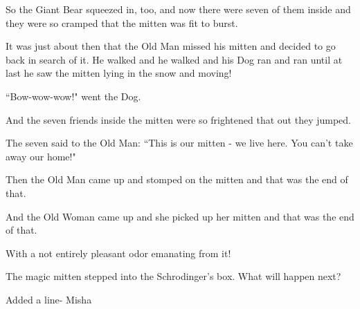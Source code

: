 \documentclass{article}
\begin{document}
So the Giant Bear squeezed in, too, and now there were seven of them inside and they were so cramped that the mitten was fit to burst.



It was just about then that the Old Man missed his mitten and decided to go back in search of it. He walked and he walked and his Dog ran and ran until at last he saw the mitten lying in the snow and moving!

``Bow-wow-wow!" went the Dog.

And the seven friends inside the mitten were so frightened that out they jumped.

The seven said to the Old Man: ``This is our mitten - we live here. You can't take away our home!"

Then the Old Man came up and stomped on the mitten and that was the end of that.

And the Old Woman came up and she picked up her mitten and that was the end of that.

With a not entirely pleasant odor emanating from it!

The magic mitten stepped into the Schrodinger's box. What will happen next?

Added a line- Misha
\end{document}

